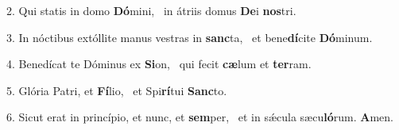 2. Qui statis in domo \textbf{Dó}mini, \ast\  in átriis domus \textbf{De}i \textbf{nos}tri.\

3. In nóctibus extóllite manus vestras in \textbf{sanc}ta, \ast\  et bene\textbf{dí}cite \textbf{Dó}minum.\

4. Benedícat te Dóminus ex \textbf{Si}on, \ast\  qui fecit \textbf{cæ}lum et \textbf{ter}ram.\

5. Glória Patri, et \textbf{Fí}lio, \ast\  et Spi\textbf{rí}tui \textbf{Sanc}to.\

6. Sicut erat in princípio, et nunc, et \textbf{sem}per, \ast\  et in sǽcula sæcu\textbf{ló}rum. \textbf{A}men.\

